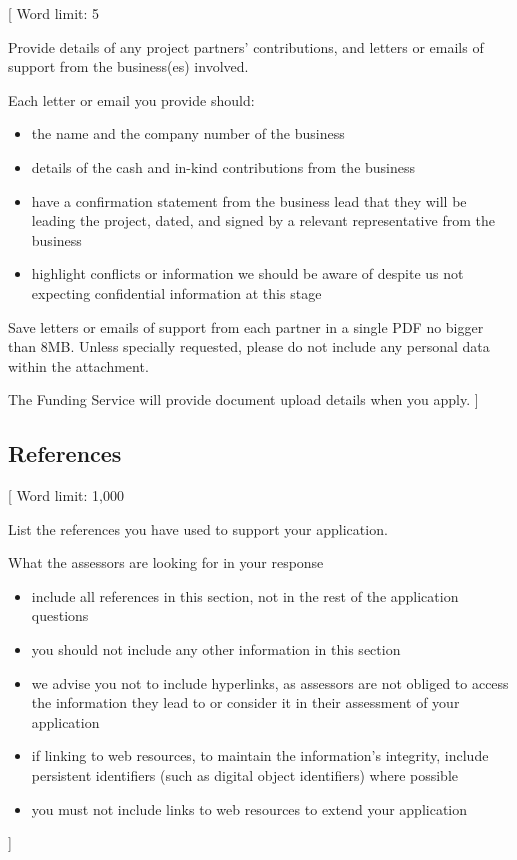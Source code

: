 \documentclass{article}
\newcommand{\desc}[1]{{\leavevmode\color{blue}[#1]}}
\begin{document}
\desc{
Word limit: 5

Provide details of any project partners’ contributions, and letters or emails
of support from the business(es) involved.

Each letter or email you provide should:

\begin{itemize}

    \item the name and the company number of the business

    \item details of the cash and in-kind contributions from the business

    \item have a confirmation statement from the business lead that they will
        be leading the project, dated, and signed by a relevant representative
        from the business

    \item highlight conflicts or information we should be aware of despite us
        not expecting confidential information at this stage

\end{itemize}

Save letters or emails of support from each partner in a single PDF no bigger
than 8MB. Unless specially requested, please do not include any personal data
within the attachment.

The Funding Service will provide document upload details when you apply.
}

\subsection{References}

\desc{
Word limit: 1,000

List the references you have used to support your application.

What the assessors are looking for in your response

\begin{itemize}

    \item include all references in this section, not in the rest of the
        application questions

    \item you should not include any other information in this section

    \item we advise you not to include hyperlinks, as assessors are not obliged
        to access the information they lead to or consider it in their
        assessment of your application

    \item if linking to web resources, to maintain the information’s integrity,
        include persistent identifiers (such as digital object identifiers)
        where possible

    \item you must not include links to web resources to extend your
        application

\end{itemize}
}

\theendnotes
\end{document}
